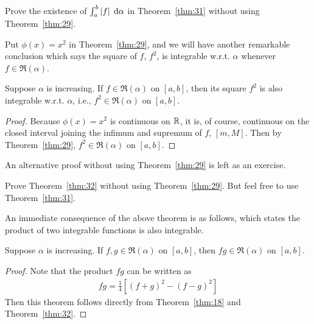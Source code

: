 \documentclass[thmcnt=section, 12pt]{my-elegantbook}
\begin{document}
\begin{exercise}
    Prove the existence of $\int_a^b \left\lvert f \right\rvert \; \mathrm{d}\alpha$ in Theorem~\ref{thm:31} without using Theorem~\ref{thm:29}.
\end{exercise}

\begin{solution}
\end{solution}


Put $\phi(x) = x^2$ in Theorem~\ref{thm:29}, and we will have another remarkable conclusion which says the square of $f$, $f^2$, is integrable w.r.t. $\alpha$ whenever $f \in \mathfrak{R}(\alpha)$.

\begin{theorem} \label{thm:32}
    Suppose $\alpha$ is increasing. If $f \in \mathfrak{R}(\alpha)$ on $[a, b]$, then its square $f^2$ is also integrable w.r.t. $\alpha$, i.e., $f^2 \in \mathfrak{R}(\alpha)$ on $[a, b]$.
\end{theorem}

\begin{proof}
    Because $\phi(x) = x^2$ is continuous on $\mathbb{R}$, it is, of course, continuous on the closed interval joining the infimum and supremum of $f$, $[m, M]$. Then by Theorem~\ref{thm:29}, $f^2 \in \mathfrak{R}(\alpha)$ on $[a, b]$. 
\end{proof}

An alternative proof without using Theorem~\ref{thm:29} is left as an exercise.

\begin{exercise}
    Prove Theorem~\ref{thm:32} without using Theorem~\ref{thm:29}. But feel free to use Theorem~\ref{thm:31}.
\end{exercise}

\begin{solution}
\end{solution}


An immediate consequence of the above theorem is as follows, which states the product of two integrable functions is also integrable.

\begin{theorem} \label{thm:38}
    Suppose $\alpha$ is increasing. If $f, g \in \mathfrak{R}(\alpha)$ on $[a, b]$, then $fg \in \mathfrak{R}(\alpha)$ on $[a, b]$.
\end{theorem}

\begin{proof}
    Note that the product $fg$ can be written as 
    \begin{align*}
        f g = \frac{1}{4} [
            (f + g)^2 - (f - g)^2
        ]
    \end{align*}
    Then this theorem follows directly from Theorem~\ref{thm:18} and Theorem~\ref{thm:32}.
\end{proof}
\end{document}
